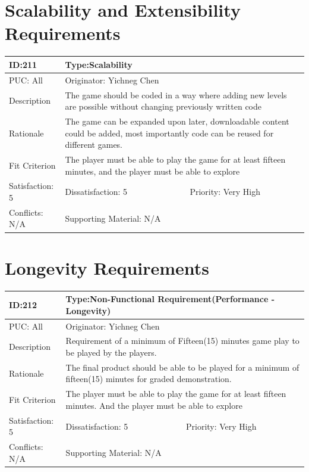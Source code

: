\documentclass{article}
\begin{document}
\section{Scalability and Extensibility Requirements}
\begin{table}[H]
    \begin{tabular}{|l|l|l|}
    \hline
    ID:211 & \multicolumn{2}{l|}{Type:Scalability} \\ \hline
    PUC: All & \multicolumn{2}{l|}{Originator: Yichneg Chen} \\ \hline
    Description & \multicolumn{2}{m{0.85\textwidth}|}{The game should be coded in a way where adding new levels are possible without changing previously written code} \\ \hline
    Rationale & \multicolumn{2}{m{0.85\textwidth}|}{The game can be expanded upon later, downloadable content could be added, most importantly code can be reused for different games.} \\ \hline
    Fit Criterion & \multicolumn{2}{m{0.85\textwidth}|}{The player must be able to play the game for at least fifteen minutes, and the player must be able to explore} \\ \hline
    Satisfaction: 5 & Dissatisfaction: 5 & Priority: Very High \\ \hline
    Conflicts: N/A & \multicolumn{2}{l|}{Supporting Material: N/A} \\ \hline
    \end{tabular}
    \end{table}

\section{Longevity Requirements}
\begin{table}[H]
    \begin{tabular}{|l|l|l|}
    \hline
    ID:212 & \multicolumn{2}{l|}{Type:Non-Functional Requirement(Performance - Longevity)} \\ \hline
    PUC: All & \multicolumn{2}{l|}{Originator: Yichneg Chen} \\ \hline
    Description & \multicolumn{2}{m{0.85\textwidth}|}{Requirement of a minimum of Fifteen(15) minutes game play to be played by the players.} \\ \hline
    Rationale & \multicolumn{2}{m{0.85\textwidth}|}{The final product should be able to be played for a minimum of fifteen(15) minutes for graded demonstration.} \\ \hline
    Fit Criterion & \multicolumn{2}{m{0.85\textwidth}|}{The player must be able to play the game for at least fifteen minutes. And the player must be able to explore} \\ \hline
    Satisfaction: 5 & Dissatisfaction: 5 & Priority: Very High \\ \hline
    Conflicts: N/A & \multicolumn{2}{l|}{Supporting Material: N/A} \\ \hline
    \end{tabular}
    \end{table}
    
\end{document}
